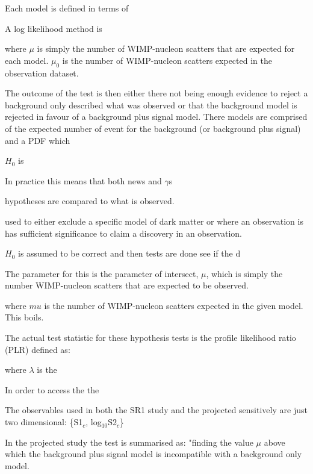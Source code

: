 \par
Each model is defined in terms of 



A log likelihood method is 


where $\mu$ is simply the number of WIMP-nucleon scatters that are expected for each model.
$\mu_0$ is the number of WIMP-nucleon scatters expected in the observation dataset.



The outcome of the test is then either there not being enough evidence to reject a background only described what was observed or that the background model is rejected in favour of a background plus signal model.
There models are comprised of the expected number of event for the background (or background plus signal) and a PDF which 


$H_0$ is 

\par
In practice this means that both news and $\gamma$s


hypotheses are compared to what is observed.

used to either exclude a specific model of dark matter or where an observation is has sufficient significance to claim a discovery in an observation.

$H_0$ is assumed to be correct and then tests are done see if the
d

The parameter for this is the parameter of intersect, $\mu$, which is simply the number WIMP-nucleon scatters that are expected to be observed.




where $mu$ is the number of WIMP-nucleon scatters expected in the given model.
This boils.

\par
The actual test statistic for these hypothesis tests is the profile likelihood ratio (PLR) defined as: 





where $\lambda$ is the 

In order to access the the 

The observables used in both the SR1 study and the projected sensitively are just two dimensional: \{S1$_c$, log$_{10}$S2$_c$\} 

\par
In the projected study the test is summarised as:
"finding the value $\mu$ above which the background plus signal model is incompatible with a background only model.

